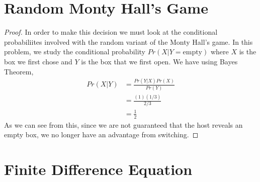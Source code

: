 \documentclass{article}
\begin{document}
\section{Random Monty Hall's Game}
    \begin{proof}
        In order to make this decision we must look at the conditional
        probabiliites involved with the random variant of the Monty Hall's game.
        In this problem, we study the conditional probability $Pr(X|Y =
        \text{empty})$ where
        $X$ is the box we first chose and $Y$ is the box that we first open. 
        We have using Bayes Theorem, 
        \begin{align*}
            Pr(X|Y) &= \frac{Pr(Y|X)Pr(X)}{Pr(Y)}
            \\
            &= \frac{(1)(1/3)}{2/3} 
            \\
            &= \frac{1}{2}
        \end{align*}
        As we can see from this, since we are not guaranteed that the host
        reveals an empty box, we no longer have an advantage from switching. 
    \end{proof}

\section{Finite Difference Equation}
\end{document}

